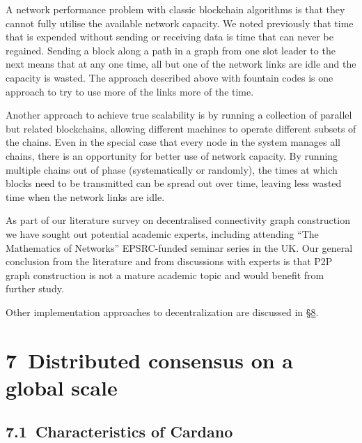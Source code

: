 \documentclass[]{article}
\begin{document}
A network performance problem with classic blockchain algorithms is that
they cannot fully utilise the available network capacity. We noted
previously that time that is expended without sending or receiving data
is time that can never be regained. Sending a block along a path in a
graph from one slot leader to the next means that at any one time, all
but one of the network links are idle and the capacity is wasted. The
approach described above with fountain codes is one approach to try to
use more of the links more of the time.

Another approach to achieve true scalability is by running a collection
of parallel but related blockchains, allowing different machines to
operate different subsets of the chains. Even in the special case that
every node in the system manages all chains, there is an opportunity for
better use of network capacity. By running multiple chains out of phase
(systematically or randomly), the times at which blocks need to be
transmitted can be spread out over time, leaving less wasted time when
the network links are idle.

As part of our literature survey on decentralised connectivity graph
construction we have sought out potential academic experts, including
attending ``The Mathematics of Networks'' EPSRC-funded seminar series in
the UK. Our general conclusion from the literature and from discussions
with experts is that P2P graph construction is not a mature academic
topic and would benefit from further study.

Other implementation approaches to decentralization are discussed in
\protect\hyperlink{analysis-of-alternative-approaches}{{§8}}.

\hypertarget{distributed-consensus-on-a-global-scale}{%
\section{​7​~Distributed consensus on a global
scale}\label{distributed-consensus-on-a-global-scale}}

\hypertarget{characteristics-of-cardano}{%
\subsection{​7.1​~Characteristics of
Cardano}\label{characteristics-of-cardano}}
\end{document}
